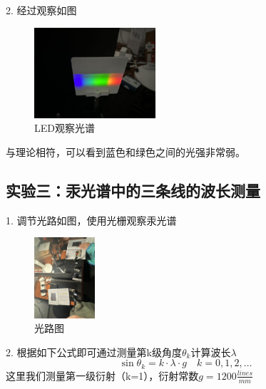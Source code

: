 \documentclass{ctexart}
\begin{document}
2. 经过观察如图
\begin{figure}[H]
    \centering
    \includegraphics[width=0.4\textwidth,height=0.2\textwidth]{pictures/微信图片_20241107162045.jpg}
    \caption{LED观察光谱}
\end{figure}
与理论相符，可以看到蓝色和绿色之间的光强非常弱。

\subsection{实验三：汞光谱中的三条线的波长测量}
1. 调节光路如图，使用光栅观察汞光谱
\begin{figure}[H]
    \centering
    \includegraphics[width=0.2\textwidth,height=0.3\textwidth]{pictures/微信图片_20241107162049.jpg}
    \caption{光路图}
\end{figure}

2. 根据如下公式即可通过测量第k级角度$\theta_k$计算波长$\lambda$
\begin{equation}
    \sin \theta_k = k \cdot \lambda \cdot g \quad k=0,1,2,\ldots
\end{equation}
这里我们测量第一级衍射（k=1），衍射常数$g=1200  \frac{lines}{mm}$
\end{document}
